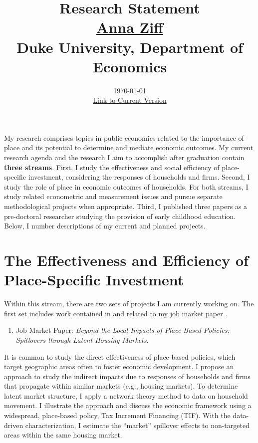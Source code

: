 

\setlength{\parskip}{\baselineskip}%
\setlength{\parindent}{0pt}%
\setlength{\droptitle}{-5em}



\title{\normalsize \textbf{Research Statement} \\ \href{https://aziff.github.io}{Anna Ziff} \\ Duke University, Department of Economics}
\date{\vspace{-2.25cm} \normalsize \today \\ \href{https://www.dropbox.com/scl/fi/cpkgsn0q5n055d53jussa/AnnaZiff_ResearchStatement.pdf?rlkey=ylj2w4sumidwasqk08gfi3p7t&dl=0}{Link to Current Version}}
\maketitle

My research comprises topics in public economics related to the importance of place and its potential to determine and mediate economic outcomes. My current research agenda and the research I aim to accomplish after graduation contain \textbf{three streams}. First, I study the effectiveness and social efficiency of place-specific investment, considering the responses of households and firms. Second, I study the role of place in economic outcomes of households. For both streams, I study related econometric and measurement issues and pursue separate methodological projects when appropriate. Third, I published three papers as a pre-doctoral researcher studying the provision of early childhood education. Below, I number descriptions of my current and planned projects.

\section{The Effectiveness and Efficiency of Place-Specific Investment}

Within this stream, there are two sets of projects I am currently working on. The first set includes work contained in and related to my job market paper \citep{ziff_local_2023}. 


\begin{enumerate}
\item Job Market Paper: \textit{Beyond the Local Impacts of Place-Based Policies: Spillovers through Latent Housing Markets}.
\end{enumerate}

It is common to study the direct effectiveness of place-based policies, which target geographic areas often to foster economic development. I propose an approach to study the indirect impacts due to responses of households and firms that propagate within similar markets (e.g., housing markets). To determine latent market structure, I apply a network theory method to data on household movement. I illustrate the approach and discuss the economic framework using a widespread, place-based policy, Tax Increment Financing (TIF). With the data-driven characterization, I estimate the ``market'' spillover effects to non-targeted areas within the same housing market. 


